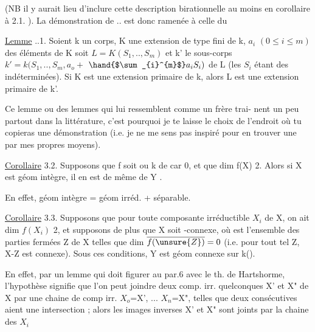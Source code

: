 
(NB il y aurait lieu d'inclure cette description birationnelle au moins
en corollaire à 2.1. ). La démonstration de .. est donc ramenée à
celle du

\uline{Lemme} ..1.  Soient k un corps, K une extension de type fini de k, 
$a_i$ $(0\leqslant i\leqslant m)$ des éléments de K  
 soit $L = K(S_1,..,S_m)$ et k' le sous-corps $k'= k(S_1,..,S_m,a_o +$
$\hand{$\sum_{i}^{m}$}a_iS_i)$ de L (les $S_i$ étant des indéterminées). \hand{,} Si K est une
extension primaire de k, alors L est une extension primaire de k'.

\margin{$|$} Ce lemme\hand{,} ou des lemmes qui lui ressemblent comme un frère\hand{,} trai-%
nent un peu partout dans la littérature, c'est pourquoi je te laisse le
choix de l'endroit où tu copieras une démonstration (i.e. je ne me sens
pas inspiré pour en trouver une par mes propres moyens).

\uline{Corollaire} 3.2. Supposons que f soit   ou k de car 0,
et que dim f(X)\over{$>$}{$\geqslant$} 2. Alors si X est géom intègre, il en est de même de
Y .

En effet, géom intègre = géom irréd. + séparable.

\uline{Corollaire} 3.3. Supposons  que pour toute composante irréductible $X_i$
de X, on ait dim $f(X_i)$\over{$>$}{$\geqslant$} 2, et supposons de plus que X soit -connexe,
où  est l'ensemble des parties fermées Z de X telles que dim $\overline{f(\unsure{Z})}=0$
(i.e. pour tout tel Z, X-Z est connexe). Sous ces conditions, Y est
géom connexe sur k().

En effet, par un lemme qui doit figurer au par.6 avec le th. de
Hartshorme, l'hypothèse signifie que l'on peut joindre deux comp. irr.
quelconques X' et X" de X par une chaine de comp irr. $X_o$=X', ...
$X_n$=X", telles que deux consécutives aient une intersection ; alors
les images inverses X' et X" sont joints par la chaine des $X_{i}$ 

